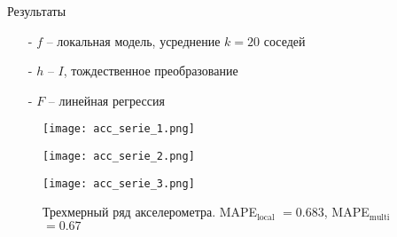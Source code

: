 \documentclass{beamer}
\begin{document}
\begin{frame}{Результаты}
\begin{itemize}
\item[-] $f$ -- локальная модель, усреднение $k = 20$ соседей
\item[-] $h$ -- $I$, тождественное преобразование
\item[-] $F$ -- линейная регрессия
\end{itemize}

\begin{figure}[h]
  \begin{minipage}{0.45\textwidth}
    \texttt{[image: acc\_serie\_1.png]}
  
  \end{minipage}\hfill
  \begin{minipage}{0.45\textwidth}
    \texttt{[image: acc\_serie\_2.png]}
  
  \end{minipage}\hfill
\end{figure}

\begin{figure}[h]
  \begin{minipage}{0.45\textwidth}
    \texttt{[image: acc\_serie\_3.png]}
  
  \end{minipage}\hfill
  \caption*{Трехмерный ряд акселерометра. MAPE$_{\text{local}}$ $= 0.683$, MAPE$_{\text{multi}}$ $= 0.67$}
\end{figure}


\end{frame}
\end{document}

